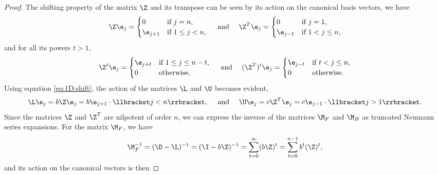 \begin{proof}
The shifting property of the matrix $\Z$ and its transpose can be seen by its
action on the canonical basis vectors, we have
%
\begin{equation}\label{eq:1D:shift}
\Z\e_j=\begin{cases}
0 &\mbox{if } j=n, \\
\e_{j+1}& \mbox{if } 1 \leq j < n,
\end{cases}
\quad\text{ and }\quad
\Z^T\e_j=\begin{cases}
0 &\mbox{if } j=1, \\
\e_{j-1}& \mbox{if } 1 < j \leq n,
\end{cases}
\end{equation}
%
and for all its powers $t>1$,
%
\begin{equation}\label{eq:1D:shiftk}
\Z^t\e_j=\begin{cases}
\e_{j+t} &\mbox{if } 1 \leq j \leq n-t, \\
0 & \mbox{otherwise},
\end{cases}
\quad\text{ and }\quad
(\Z^T)^t\e_j=\begin{cases}
\e_{j-t} &\mbox{if } t < j \leq n, \\
0 & \mbox{otherwise}.
\end{cases}
\end{equation}
%
Using equation \eqref{eq:1D:shift}, the action of the matrices $\L$ and $\U$
becomes evident,
\begin{equation*}
\L\e_j=b\Z\e_j=b\e_{j+1}\cdot\llbracket j<n \rrbracket,
\quad\text{ and }\quad
\U\e_j=c\Z^T\e_j=c\e_{j-1}\cdot\llbracket j>1 \rrbracket.
\end{equation*}
%
Since the matrices $\Z$ and $\Z^T$ are nilpotent of order $n$, we can express
the inverse of the matrices $\M_F$ and $\M_B$ as truncated Neumann series
expansions. For the matrix $\M_F$, we have
\begin{equation*}
\M_{F}^{-1} = (\D-\L)^{-1} = (\I-b\Z)^{-1} = \sum_{t=0}^{\infty}(b\Z)^{t} =
\sum_{t=0}^{n-1} b^t(\Z)^{t},
\end{equation*}
and its action on the canonical vectors is then

\end{proof}

